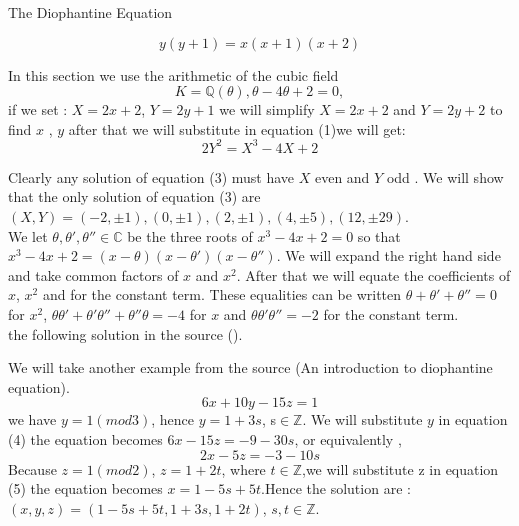 \documentclass[]{article}
\begin{document}
                        The Diophantine Equation

\begin{equation}
	y(y+1)=x(x+1)(x+2)
\end{equation}

In this section we use the arithmetic of the cubic field
 \begin{equation}
	K=\mathbb{Q}(\theta), \theta -4\theta +2=0,
 \end{equation} 
 if we set :
      $X=2x+2$, $Y=2y+1$
     we will simplify $X=2x+2$ and $Y=2y+2$ to find $x$ , $y$ after that we will substitute in equation (1)we will get:
     \begin{equation}
     	2Y^2=X^3-4X+2
     \end{equation}

     Clearly any solution of equation (3) must have $X$ even and $Y$ odd . We will show that the only solution of equation (3) are 
     \\$(X,Y)=(-2,\pm1), (0,\pm1), (2,\pm1), (4,\pm5),(12,\pm29)$.
     \\We let $\theta, 	\theta', \theta'' \in \mathbb{C}$ be  the three roots of $x^3-4x+2=0$ so that 
     $x^3-4x+2=(x-\theta) (x-\theta') (x-\theta'').$ We will expand the right hand side and take  common factors of  $x$ and $x^2$. After that we will equate the coefficients of $x$, $x^2$ and for the constant term. These equalities can be written $\theta + \theta' +\theta'' = 0$ for $x^2$, $\theta\theta' + \theta' \theta'' + \theta''\theta = -4$ for $x$ and $\theta\theta'\theta'' = -2$ for the constant term. 
     \\the following solution in the source ().
     
 We will take another example from the source (An introduction to diophantine equation).
     \begin{equation}
  6x+10y-15z=1
     \end{equation}
     we have $y=1(mod 3)$, hence $y=1+3s$, s$\in \mathbb{Z}$.
     We will substitute $y$ in equation (4) the equation becomes
     $6x-15z=-9-30s$, or equivalently ,
     \begin{equation}
      2x-5z=-3-10s
      \end{equation}
  Because $z=1 (mod 2)$, $z=1+2t$, where $ t\in\mathbb{Z}$,we will substitute z in equation (5) the equation becomes $x=1-5s+5t$.Hence the solution are :
 \\ $ (x,y,z)=(1-5s+5t,1+3s,1+2t)$, $s,t\in \mathbb{Z}$.
 
  
     \newpage
     
\end{document}
